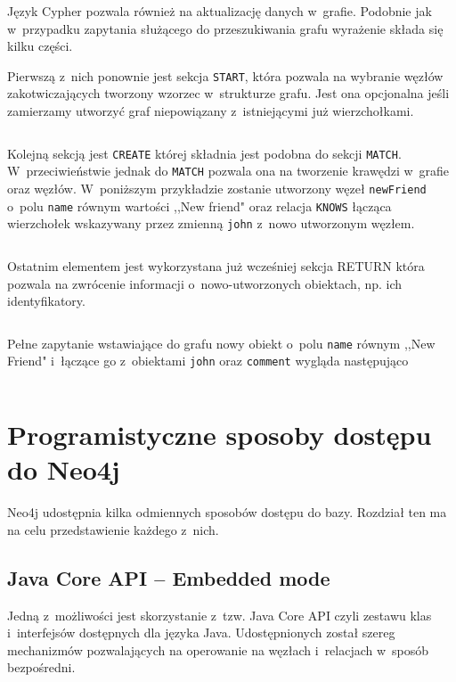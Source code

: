 \documentclass[brudnopis]{xmgr}
\begin{document}
Język Cypher pozwala również na aktualizację danych w~grafie. Podobnie jak w~przypadku zapytania służącego do przeszukiwania grafu wyrażenie składa się kilku części.

Pierwszą z~nich ponownie jest sekcja \texttt{START}, która pozwala na wybranie węzłów zakotwiczających tworzony wzorzec w~strukturze grafu. Jest ona opcjonalna jeśli zamierzamy utworzyć graf niepowiązany z~istniejącymi już wierzchołkami.

\inputminted{cypher}{listings/cypher/start-section.cypher}

Kolejną sekcją jest \texttt{CREATE} której składnia jest podobna do sekcji \texttt{MATCH}. W~przeciwieństwie jednak do \texttt{MATCH} pozwala ona na tworzenie krawędzi w~grafie oraz węzłów. W~poniższym przykładzie zostanie utworzony węzeł \texttt{newFriend} o~polu \texttt{name} równym wartości ,,New friend" oraz relacja \texttt{KNOWS} łącząca wierzchołek wskazywany przez zmienną \texttt{john} z~nowo utworzonym węzłem.

\inputminted{cypher}{listings/cypher/create-section.cypher}

Ostatnim elementem jest wykorzystana już wcześniej sekcja RETURN która pozwala na zwrócenie informacji o~nowo-utworzonych obiektach, np. ich identyfikatory.

\inputminted{cypher}{listings/cypher/return-section-2.cypher}

Pełne zapytanie wstawiające do grafu nowy obiekt o~polu \texttt{name} równym ,,New Friend" i~łączące go z~obiektami \texttt{john} oraz \texttt{comment} wygląda następująco

\inputminted{cypher}{listings/cypher/sample-create-query.cypher}

\section{Programistyczne sposoby dostępu do Neo4j}

Neo4j udostępnia kilka odmiennych sposobów dostępu do bazy. Rozdział ten ma na celu przedstawienie każdego z~nich.

\subsection{Java Core API -- Embedded mode}

Jedną z~możliwości jest skorzystanie z~tzw. Java Core API czyli zestawu klas i~interfejsów dostępnych dla języka Java. Udostępnionych został szereg mechanizmów pozwalających na operowanie na węzłach i~relacjach w~sposób bezpośredni.
\end{document}
